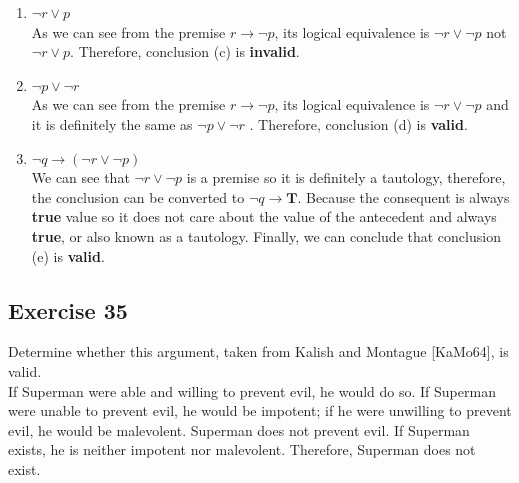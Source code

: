 \documentclass{article}
\begin{document}
\begin{enumerate} [label = (\alph*)]
          As we can see that, the final conclusion is $r \to \lnot q$ not $\lnot r \to \lnot q$. Therefore, conclusion (b) is \textbf{invalid}.
    \item $\lnot r \lor p$\\

          As we can see from the premise $r \to \lnot p$, its logical equivalence is $\lnot r \lor \lnot p$ not $\lnot r \lor p$. Therefore, conclusion (c) is \textbf{invalid}.
    \item $\lnot p \lor \lnot r$\\

          As we can see from the premise $r \to \lnot p$, its logical equivalence is $\lnot r \lor \lnot p$ and it is definitely the same as $\lnot p \lor \lnot r$ . Therefore, conclusion (d) is \textbf{valid}.
    \item $\lnot q \to (\lnot r \lor \lnot p)$\\

          We can see that $\lnot r \lor \lnot p$ is a premise so it is definitely a tautology, therefore, the conclusion can be converted to $\lnot q \to \textbf{T}$. Because the consequent is always \textbf{true} value so it does not care about the value of the antecedent and always \textbf{true}, or also known as a tautology. Finally, we can conclude that conclusion (e) is \textbf{valid}.
\end{enumerate}
\subsection*{Exercise 35}
Determine whether this argument, taken from Kalish and Montague [KaMo64], is valid.\\

\quad If Superman were able and willing to prevent evil,
he would do so. If Superman were unable to prevent evil, he would be impotent; if he were unwilling
to prevent evil, he would be malevolent. Superman does not prevent evil. If Superman exists, he is neither impotent nor malevolent. Therefore, Superman
does not exist.
\end{document}
